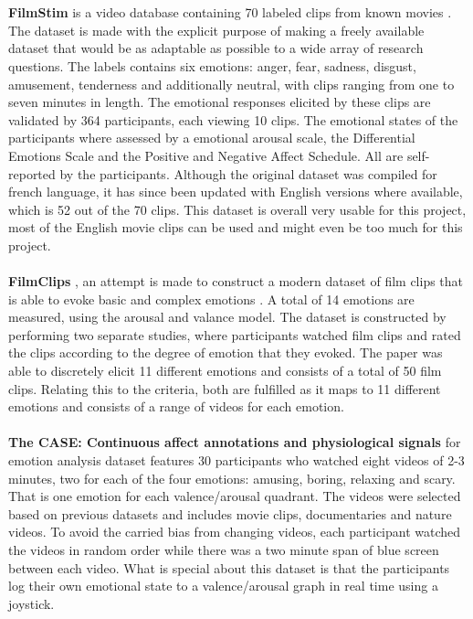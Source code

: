 \\ \\
\textbf{FilmStim} is a video database containing 70 labeled clips from known movies \cite{FilmStim}. The dataset is made with the explicit purpose of making a freely available dataset that would be as adaptable as possible to a wide array of research questions. The labels contains six emotions: anger, fear, sadness, disgust, amusement, tenderness and additionally neutral, with clips ranging from one to seven minutes in length. The emotional responses elicited by these clips are validated by 364 participants, each viewing 10 clips. The emotional states of the participants where assessed by a emotional arousal scale, the Differential Emotions Scale and  the Positive and Negative Affect Schedule. All are self-reported by the participants. \newline
Although the original dataset was compiled for french language, it has since been updated with English versions where available, which is 52 out of the 70 clips. This dataset is overall very usable for this project, most of the English movie clips can be used and might even be too much for this project.
\\ \\
\textbf{FilmClips} , an attempt is made to construct a modern dataset of film clips that is able to evoke basic and complex emotions \cite{FilmClips}. A total of 14 emotions are measured, using the arousal and valance model. The dataset is constructed by performing two separate studies, where participants watched film clips and rated the clips according to the degree of emotion that they evoked. The paper was able to discretely elicit 11 different emotions and consists of a total of 50 film clips. Relating this to the criteria, both are fulfilled as it maps to 11 different emotions and consists of a range of videos for each emotion.
\\ \\
\textbf{The CASE: Continuous affect annotations and physiological signals} for emotion analysis dataset features 30 participants who watched eight videos of 2-3 minutes, two for each of the four emotions: amusing, boring, relaxing and scary. That is one emotion for each valence/arousal quadrant. The videos were selected based on previous datasets and includes movie clips, documentaries and nature videos. To avoid the carried bias from changing videos, each participant watched the videos in random order while there was a two minute span of blue screen between each video. What is special about this dataset is that the participants log their own emotional state to a valence/arousal graph in real time using a joystick. \cite{CaseData}
